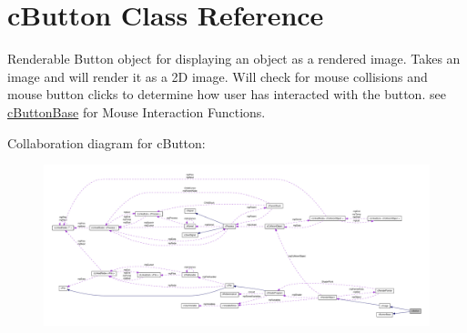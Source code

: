 \hypertarget{classc_button}{
\section{cButton Class Reference}
\label{classc_button}
}


Renderable Button object for displaying an object as a rendered image. Takes an image and will render it as a 2D image. Will check for mouse collisions and mouse button clicks to determine how user has interacted with the button. see \hyperlink{classc_button_base}{cButtonBase} for Mouse Interaction Functions.  




Collaboration diagram for cButton:\nopagebreak
\begin{figure}[H]
\begin{center}
\leavevmode
\includegraphics[width=400pt]{classc_button__coll__graph}
\end{center}
\end{figure}

